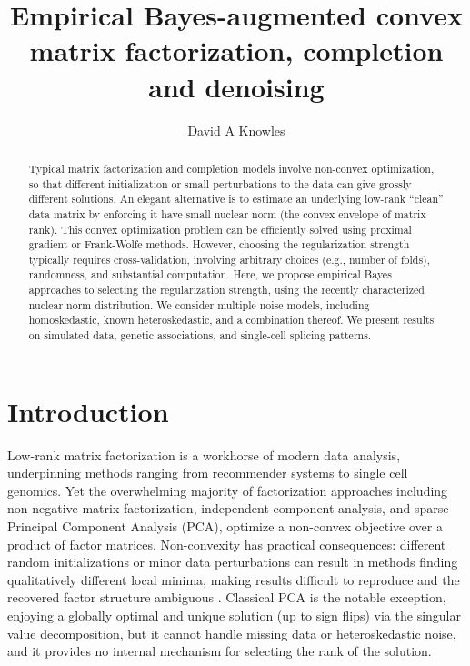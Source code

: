 \documentclass[11pt]{article}
\title{Empirical Bayes-augmented convex matrix factorization, completion and denoising}
\author{David A Knowles}
\date{}
\begin{document}
\maketitle

\begin{abstract}
Typical matrix factorization and completion models involve non-convex optimization, so that different initialization or small perturbations to the data can give grossly different solutions. An elegant alternative is to estimate an underlying low-rank ``clean'' data matrix by enforcing it have small nuclear norm (the convex envelope of matrix rank). This convex optimization problem can be efficiently solved using proximal gradient or Frank-Wolfe methods. However, choosing the regularization strength typically requires cross-validation, involving arbitrary choices (e.g., number of folds), randomness, and substantial computation. Here, we propose empirical Bayes approaches to selecting the regularization strength, using the recently characterized nuclear norm distribution. We consider multiple noise models, including homoskedastic, known heteroskedastic, and a combination thereof. We present results on simulated data, genetic associations, and single-cell splicing patterns. 
\end{abstract}

\tableofcontents

\section{Introduction}

Low-rank matrix factorization is a workhorse of modern data analysis, underpinning methods ranging from recommender systems to single cell genomics. Yet the overwhelming majority of factorization approaches including non-negative matrix factorization, independent component analysis, and sparse Principal Component Analysis (PCA), optimize a non-convex objective over a product of factor matrices. Non-convexity has practical consequences: different random initializations or minor data perturbations can result in methods finding qualitatively different local minima, making results difficult to reproduce and the recovered factor structure ambiguous \citep{lee1999learning, cai2021}. Classical PCA is the notable exception, enjoying a globally optimal and unique solution (up to sign flips) via the singular value decomposition, but it cannot handle missing data or heteroskedastic noise, and it provides no internal mechanism for selecting the rank of the solution.
\end{document}

